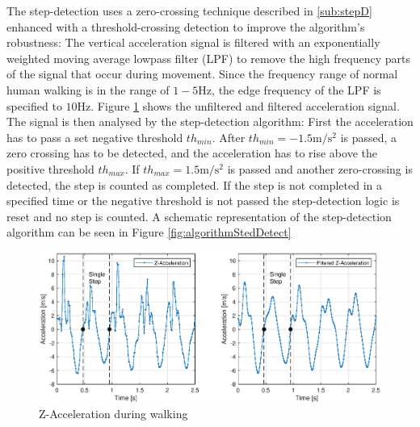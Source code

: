 \documentclass[engproc,conferenceproceedings,submit,pdftex,moreauthors]{Definitions/mdpi}
\begin{document}
 The step-detection uses a zero-crossing technique described in \ref{sub:stepD} enhanced with a threshold-crossing detection to improve the algorithm's robustness: The vertical acceleration signal is filtered with an exponentially weighted moving average lowpass filter (LPF) to remove the high frequency parts of the signal that occur during movement. Since the frequency range of normal human walking is in the range of $1-5\mathrm{Hz}$, the edge frequency of the LPF is specified to $10 \mathrm{Hz}$. Figure \ref{fig:AccelWalk} shows the unfiltered and filtered acceleration signal. The signal is then analysed by the step-detection algorithm: First the acceleration has to pass a set negative threshold $th_{min}$. After $th_{min} = -1.5\mathrm{m/s^2} $ is passed, a zero crossing has to be detected, and the acceleration has to rise above the positive threshold $th_{max}$. If $th_{max} = 1.5\mathrm{m/s^2} $ is passed and another zero-crossing is detected, the step is counted as completed. If the step is not completed in a specified time or the negative threshold is not passed the step-detection logic is reset and no step is counted. 
A schematic representation of the step-detection algorithm can be seen in Figure \ref{fig:algorithmStedDetect}


\begin{figure}[h!]
	\centering
	\includegraphics[width=\textwidth]{WalkAcceleration.eps}
	\caption{Z-Acceleration during walking}
	\label{fig:AccelWalk}
\end{figure}
\end{document}
